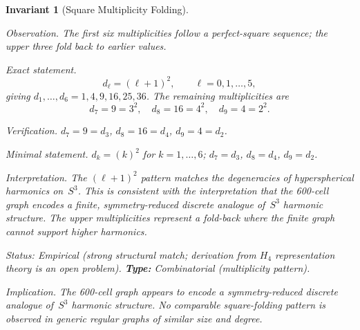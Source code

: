 \documentclass[12pt,a4paper]{article}
\newcommand{\Hfour}{H_4}
\newtheorem{invariant}{Invariant}
\begin{document}
\begin{invariant}[Square Multiplicity Folding]\label{inv:fold}

\emph{Observation.}
The first six multiplicities follow a perfect-square sequence; the
upper three fold back to earlier values.

\emph{Exact statement.}
\begin{equation}\label{eq:fold}
  d_\ell = (\ell+1)^2, \qquad \ell = 0,1,\ldots,5,
\end{equation}
giving $d_1,\ldots,d_6 = 1, 4, 9, 16, 25, 36$.  The remaining
multiplicities are
\begin{equation}\label{eq:upper}
  d_7 = 9 = 3^2, \quad d_8 = 16 = 4^2, \quad d_9 = 4 = 2^2.
\end{equation}

\emph{Verification.}
$d_7 = 9 = d_3$, $d_8 = 16 = d_4$, $d_9 = 4 = d_2$.

\emph{Minimal statement.}
$d_k = (k)^2$ for $k = 1,\ldots,6$; \;
$d_7 = d_3$, $d_8 = d_4$, $d_9 = d_2$.

\emph{Interpretation.}
The $(\ell+1)^2$ pattern matches the degeneracies of hyperspherical
harmonics on~$S^3$.  This is consistent with the interpretation that
the 600-cell graph encodes a finite, symmetry-reduced discrete
analogue of~$S^3$ harmonic structure.  The upper multiplicities
represent a fold-back where the finite graph cannot support higher
harmonics.

\emph{Status:} Empirical (strong structural match; derivation from
$\Hfour$ representation theory is an open problem). \quad
\textbf{Type:} Combinatorial (multiplicity pattern).

\emph{Implication.}
The 600-cell graph appears to encode a symmetry-reduced discrete
analogue of~$S^3$ harmonic structure.  No comparable square-folding
pattern is observed in generic regular graphs of similar size and
degree.
\end{invariant}
\end{document}
